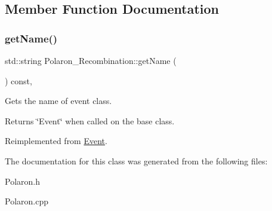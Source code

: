 \subsection{Member Function Documentation}
\mbox{\label{class_polaron___recombination_a0075250a377d6fccb8f64e4d173c9041}} 
\subsubsection{\texorpdfstring{get\+Name()}{getName()}}
{\footnotesize\ttfamily std\+::string Polaron\+\_\+\+Recombination\+::get\+Name (\begin{DoxyParamCaption}{ }\end{DoxyParamCaption}) const\hspace{0.3cm}{\ttfamily [inline]}, {\ttfamily [virtual]}}



Gets the name of event class. 

\begin{DoxyReturn}{Returns}
\char`\"{}\+Event\char`\"{} when called on the base class. 
\end{DoxyReturn}


Reimplemented from \hyperlink{class_event_a8c38a406d844d05eac1ef007bad2487f}{Event}.



The documentation for this class was generated from the following files\+:\begin{DoxyCompactItemize}
\item 
Polaron.\+h\item 
Polaron.\+cpp\end{DoxyCompactItemize}
